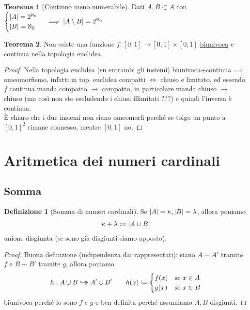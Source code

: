 \documentclass[a4paper,10pt]{article}
\theoremstyle{definition}
\newcommand{\hookdoubleheadrightarrow}{\hookrightarrow\mathrel{\mspace{-15mu}}\rightarrow}
\newcommand{\bij}{\hookdoubleheadrightarrow} %
\theoremstyle{indentdefinition}
\newtheorem{defn}{Definizione}[section]
\theoremstyle{indentpostulate}
\theoremstyle{indenttheorem}
\newtheorem{thm}{Teorema}[section]
\theoremstyle{myremark}
\theoremstyle{indentgeneral}
\newenvironment{myboxed} 
{\noindent\begin{lrbox}{\mybox}\begin{minipage}{\textwidth}}
{\end{minipage}\end{lrbox}\fbox{\usebox{\mybox}}}
\begin{document}
\begin{thm}[Continuo meno numerabile] \label{thm-continuo-meno-numerabile}
    Dati $A,B\subset A$ con $\begin{cases}
        \abs{A}=2^{\aleph_0}\\
        \abs{B}=\aleph_0
    \end{cases}\implies\abs{A\setminus B}=2^{\aleph_0}$
\end{thm}

\begin{myboxed}
\begin{thm}
    Non esiste una funzione $f:[0,1]\to[0,1]\times[0,1]$ \underline{biunivoca} e \underline{continua} nella topologia euclidea.
\end{thm}
\end{myboxed}

\begin{proof}
    Nella topologia euclidea (su entrambi gli insiemi) biunivoca+continua$\implies$ omeomorfismo, infatti in top. euclidea compatti $\iff$ chiuso e limitato, ed essendo $f$ continua manda compatto $\to$ compatto, in particolare manda chiuso $\to$ chiuso (ma così non sto escludendo i chiusi illimitati ???) e quindi l'inversa è continua.\\
    È chiaro che i due insiemi non siano omeomorfi perché se tolgo un punto a $[0,1]^2$ rimane connesso, mentre $[0,1]$ no.
\end{proof}



\pagebreak{}
\section{Aritmetica dei numeri cardinali}
\subsection{Somma}
\begin{defn}[Somma di numeri cardinali] Se
    $\abs{A}=\kappa,\abs{B}=\lambda$, allora poniamo $$\kappa+\lambda\coloneqq\abs{A\sqcup B}$$ unione disgiunta (se sono già disgiunti siamo apposto).
\end{defn}
\begin{proof} Buona definizione (indipendenza dai rappresentati): siano $A\sim A'$ tramite $f$ e  $B\sim B'$ tramite $g$, allora poniamo
$$h:A\cup B\bij A'\cup B'\qquad h(x)\coloneqq\begin{cases}
    f(x)&\text{se } x\in A\\
    g(x)&\text{se } x\in B
\end{cases}$$
    biunivoca perché lo sono $f$ e $g$ e ben definita perché assumiamo $A,B$ disgiunti.
\end{proof}
\end{document}
